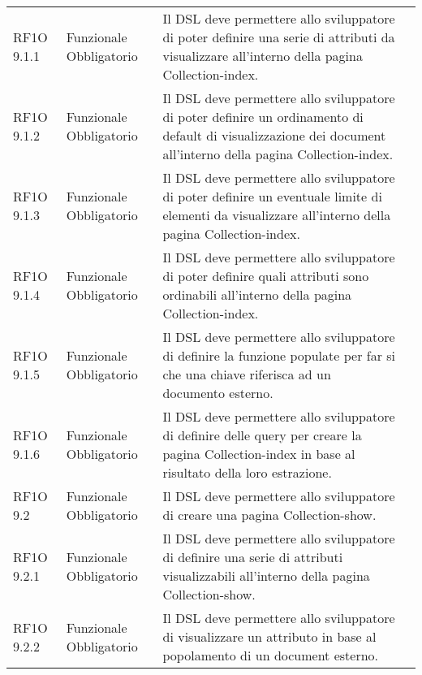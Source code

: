 \begin{center}
\begin{longtable}{ | p{2cm} | p{2cm} | p{5cm} | p{2cm} |}
 &  \\ \hline      
        RF1O 9.1.1  & Funzionale \newline  Obbligatorio  & Il DSL deve permettere allo sviluppatore di poter definire una serie di attributi da visualizzare all'interno della pagina Collection-index.
 &  \\ \hline      
        RF1O 9.1.2  & Funzionale \newline  Obbligatorio  & Il DSL deve permettere allo sviluppatore di poter definire un ordinamento di default di visualizzazione dei document all'interno della pagina Collection-index. &  \\ \hline      
        RF1O 9.1.3  & Funzionale \newline  Obbligatorio  & Il DSL deve permettere allo sviluppatore di poter definire un eventuale limite di elementi da visualizzare all'interno della pagina Collection-index.
 &  \\ \hline      
        RF1O 9.1.4  & Funzionale \newline  Obbligatorio  & Il DSL deve permettere allo sviluppatore di poter definire quali attributi sono ordinabili all'interno della pagina Collection-index.
 &  \\ \hline      
        RF1O 9.1.5 & Funzionale \newline  Obbligatorio  & Il DSL deve permettere allo sviluppatore di definire la funzione populate per far si che una chiave riferisca ad un documento esterno.
 &  \\ \hline      
        RF1O 9.1.6 & Funzionale \newline  Obbligatorio  & Il DSL deve permettere allo sviluppatore di definire delle query per creare la pagina Collection-index in base al risultato della loro estrazione.
 &  \\ \hline      
        RF1O 9.2 & Funzionale \newline  Obbligatorio  & Il DSL deve permettere allo sviluppatore di creare una pagina Collection-show. &  \\ \hline      
        RF1O 9.2.1  & Funzionale \newline  Obbligatorio  & Il DSL deve permettere allo sviluppatore di definire una serie di attributi visualizzabili all'interno della pagina Collection-show.
 &  \\ \hline      
        RF1O 9.2.2  & Funzionale \newline  Obbligatorio  & Il DSL deve permettere allo sviluppatore di visualizzare un attributo in base al popolamento di un document esterno.

\end{longtable}
\end{center}
